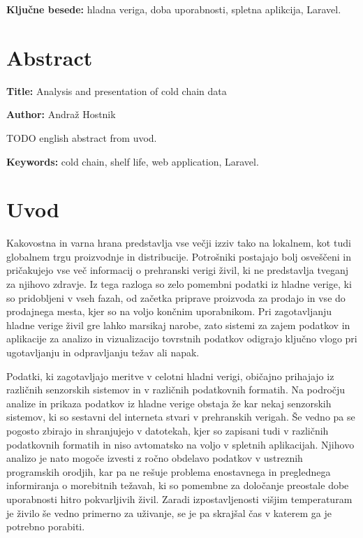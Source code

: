 \documentclass[a4paper, 12pt]{book}
\newcommand{\ttitleEn}{Analysis and presentation of cold chain data}
\newcommand{\tauthor}{Andraž Hostnik}
\newcommand{\tkeywords}{hladna veriga, doba uporabnosti, spletna aplikcija, Laravel}
\newcommand{\tkeywordsEn}{cold chain, shelf life, web application, Laravel}
\newcommand{\clearemptydoublepage}{\newpage{\pagestyle{empty}\cleardoublepage}}
\begin{document}
\noindent\textbf{Ključne besede:} \tkeywords.
\clearemptydoublepage

\chapter*{Abstract}

\noindent\textbf{Title:} \ttitleEn
\bigskip

\noindent\textbf{Author:} \tauthor
\bigskip

\noindent TODO english abstract from uvod.
\bigskip

\noindent\textbf{Keywords:} \tkeywordsEn.
\clearemptydoublepage

\mainmatter
\setcounter{page}{1}
\pagestyle{fancy}

\chapter{Uvod}
Kakovostna in varna hrana predstavlja vse večji izziv tako na lokalnem, kot tudi globalnem trgu proizvodnje in distribucije. Potrošniki postajajo bolj osveščeni in pričakujejo vse več informacij o prehranski verigi živil, ki ne predstavlja tveganj za njihovo zdravje. Iz tega razloga so zelo pomembni podatki iz hladne verige, ki so pridobljeni v vseh fazah, od začetka priprave proizvoda za prodajo in vse do prodajnega mesta, kjer so na voljo končnim uporabnikom. Pri zagotavljanju hladne verige živil gre lahko marsikaj narobe, zato sistemi za zajem podatkov in aplikacije za analizo in vizualizacijo tovrstnih podatkov odigrajo ključno vlogo pri ugotavljanju in odpravljanju težav ali napak.

Podatki, ki zagotavljajo meritve v celotni hladni verigi, običajno prihajajo iz različnih senzorskih sistemov in v različnih podatkovnih formatih. Na področju analize in prikaza podatkov iz hladne verige obstaja že kar nekaj senzorskih sistemov, ki so sestavni del interneta stvari v prehranskih verigah. Še vedno pa se pogosto zbirajo in shranjujejo v datotekah, kjer so zapisani tudi v različnih podatkovnih formatih in  niso avtomatsko na voljo v spletnih aplikacijah. Njihovo analizo je nato mogoče izvesti z ročno obdelavo podatkov v ustreznih programskih orodjih, kar pa ne rešuje problema enostavnega in preglednega informiranja o morebitnih težavah, ki so pomembne za določanje preostale dobe uporabnosti hitro pokvarljivih živil. Zaradi izpostavljenosti višjim temperaturam je živilo še vedno primerno za uživanje, se je pa skrajšal čas v katerem ga je potrebno porabiti. 
\end{document}
